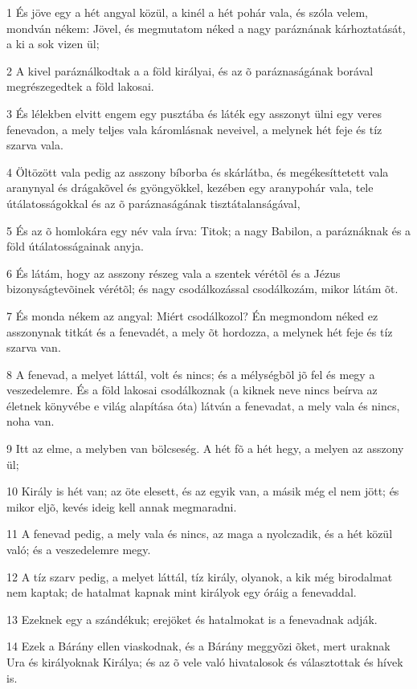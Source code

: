 \par 1 És jöve egy a hét angyal közül, a kinél a hét pohár vala, és szóla velem, mondván nékem: Jövel, és megmutatom néked a nagy paráznának  kárhoztatását, a ki a sok vizen ül;
\par 2 A kivel paráználkodtak a a föld királyai, és az õ paráznaságának  borával megrészegedtek a föld lakosai.
\par 3 És lélekben elvitt engem egy pusztába és láték egy asszonyt ülni egy veres fenevadon, a mely teljes vala káromlásnak neveivel, a melynek hét feje és tíz szarva vala.
\par 4 Öltözött vala pedig az asszony bíborba és skárlátba, és megékesíttetett vala aranynyal és drágakõvel és gyöngyökkel, kezében egy aranypohár vala, tele útálatosságokkal és az õ paráznaságának tisztátalanságával,
\par 5 És az õ homlokára egy név vala írva: Titok; a nagy Babilon, a paráznáknak és a föld útálatosságainak anyja.
\par 6 És látám, hogy az asszony részeg vala a szentek vérétõl és a Jézus bizonyságtevõinek vérétõl; és nagy csodálkozással csodálkozám, mikor látám õt.
\par 7 És monda nékem az angyal: Miért csodálkozol? Én megmondom néked ez asszonynak titkát és a fenevadét, a mely õt hordozza, a melynek hét feje és tíz szarva van.
\par 8 A fenevad, a melyet láttál, volt és nincs; és a mélységbõl jõ fel és megy a veszedelemre. És a föld lakosai csodálkoznak (a kiknek neve nincs beírva az életnek könyvébe  e világ alapítása óta) látván a fenevadat, a mely vala és nincs, noha van.
\par 9 Itt az elme, a melyben van bölcseség. A hét  fõ a hét hegy, a melyen az asszony ül;
\par 10 Király is hét van; az öte elesett, és az egyik van, a másik még el nem jött; és mikor eljõ, kevés ideig kell annak megmaradni.
\par 11 A fenevad pedig, a mely vala és nincs, az maga a nyolczadik, és a hét közül való; és a veszedelemre megy.
\par 12 A tíz szarv pedig, a melyet láttál, tíz király, olyanok, a kik még birodalmat nem kaptak; de hatalmat kapnak mint királyok egy óráig a fenevaddal.
\par 13 Ezeknek egy a szándékuk; erejöket és hatalmokat is a fenevadnak adják.
\par 14 Ezek a Bárány ellen viaskodnak, és a Bárány meggyõzi õket, mert uraknak Ura és királyoknak Királya; és az õ vele való hivatalosok és választottak és hívek is.
